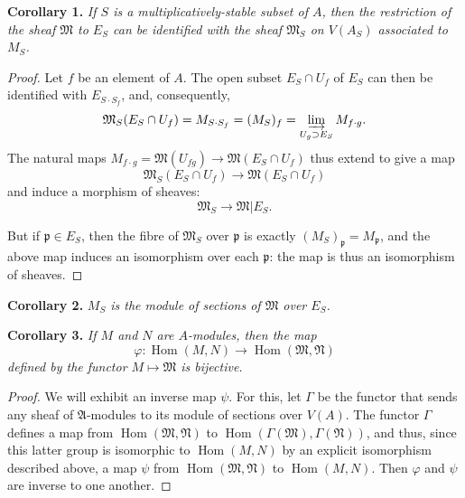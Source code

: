 \documentclass[british]{article}
\newenvironment{itenv}[1]
  {\phantomsection\par\smallskip\noindent\textbf{#1.}\itshape}
  {\par\smallskip}
\newcommand{\oldpage}[1]{\marginpar{\footnotesize$\Big\vert$ \textit{p.~#1}}}
\begin{document}
\protect{}\label{corollary-1}
\begin{itenv}{Corollary 1}
If \(S\) is a multiplicatively-stable subset of \(A\), then the
restriction of the sheaf \(\mathfrak{M}\) to \(E_S\) can be identified
with the sheaf \(\mathfrak{M}_S\) on \(V(A_S)\) associated to \(M_S\).

\end{itenv}

\begin{proof}
Let \(f\) be an element of \(A\). The open subset \(E_S\cap U_f\) of
\(E_S\) can then be identified with \(E_{S\cdot S_f}\), and,
consequently, \[
  \mathfrak{M}_S(E_S\cap U_f)
  = M_{S\cdot S_f}
  = (M_S)_f
  = \varinjlim_{U_g\supset E_S}M_{f\cdot g}.
\] The natural maps
\(M_{f\cdot g}=\mathfrak{M}(U_{fg})\to\mathfrak{M}(E_S\cap U_f)\) thus
extend to give a map \[
  \mathfrak{M}_S(E_S\cap U_f) \to \mathfrak{M}(E_S\cap U_f)
\] and induce a morphism of sheaves: \[
  \mathfrak{M}_S \to \mathfrak{M}|E_S.
\]

But if \(\mathfrak{p}\in E_S\), then the fibre of \(\mathfrak{M}_S\)
over \(\mathfrak{p}\) is exactly \((M_S)_\mathfrak{p}=M_\mathfrak{p}\),
and the above map induces an isomorphism over each \(\mathfrak{p}\): the
map is thus an isomorphism of sheaves.
\end{proof}

\oldpage{1-07}

\protect{}\label{corollary-2}
\begin{itenv}{Corollary 2}
\(M_S\) is the module of sections of \(\mathfrak{M}\) over \(E_S\).

\end{itenv}

\protect{}\label{corollary-3}
\begin{itenv}{Corollary 3}
If \(M\) and \(N\) are \(A\)-modules, then the map
\[\varphi\colon\operatorname{Hom}(M,N)\to\operatorname{Hom}(\mathfrak{M},\mathfrak{N})\]
defined by the functor \(M\mapsto\mathfrak{M}\) is bijective.

\end{itenv}

\begin{proof}
We will exhibit an inverse map \(\psi\). For this, let \(\Gamma\) be the
functor that sends any sheaf of \(\mathfrak{A}\)-modules to its module
of sections over \(V(A)\). The functor \(\Gamma\) defines a map from
\(\operatorname{Hom}(\mathfrak{M},\mathfrak{N})\) to
\(\operatorname{Hom}(\Gamma(\mathfrak{M}),\Gamma(\mathfrak{N}))\), and
thus, since this latter group is isomorphic to
\(\operatorname{Hom}(M,N)\) by an explicit isomorphism described above,
a map \(\psi\) from \(\operatorname{Hom}(\mathfrak{M},\mathfrak{N})\) to
\(\operatorname{Hom}(M,N)\). Then \(\varphi\) and \(\psi\) are inverse
to one another.
\end{proof}
\end{document}
